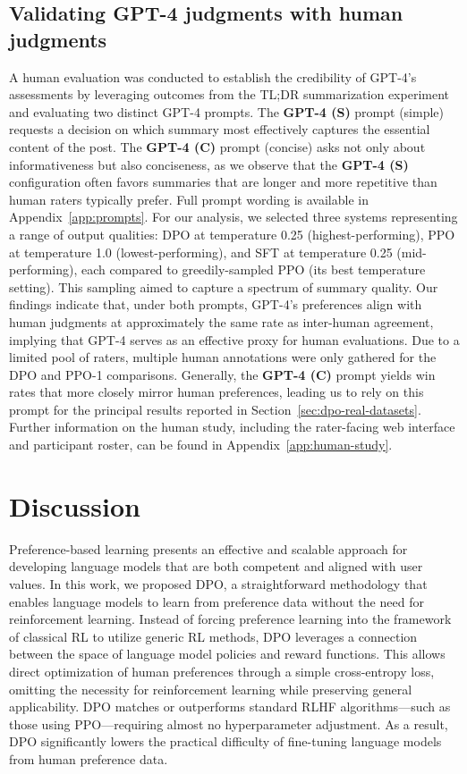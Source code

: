 \subsection{Validating GPT-4 judgments with human judgments}
\label{sec:human-judgments}
A human evaluation was conducted to establish the credibility of GPT-4's assessments by leveraging outcomes from the TL;DR summarization experiment and evaluating two distinct GPT-4 prompts. The \textbf{GPT-4 (S)} prompt (simple) requests a decision on which summary most effectively captures the essential content of the post. The \textbf{GPT-4 (C)} prompt (concise) asks not only about informativeness but also conciseness, as we observe that the \textbf{GPT-4 (S)} configuration often favors summaries that are longer and more repetitive than human raters typically prefer. Full prompt wording is available in Appendix~\ref{app:prompts}. For our analysis, we selected three systems representing a range of output qualities: DPO at temperature 0.25 (highest-performing), PPO at temperature 1.0 (lowest-performing), and SFT at temperature 0.25 (mid-performing), each compared to greedily-sampled PPO (its best temperature setting). This sampling aimed to capture a spectrum of summary quality. Our findings indicate that, under both prompts, GPT-4’s preferences align with human judgments at approximately the same rate as inter-human agreement, implying that GPT-4 serves as an effective proxy for human evaluations. Due to a limited pool of raters, multiple human annotations were only gathered for the DPO and PPO-1 comparisons. Generally, the \textbf{GPT-4 (C)} prompt yields win rates that more closely mirror human preferences, leading us to rely on this prompt for the principal results reported in Section~\ref{sec:dpo-real-datasets}. Further information on the human study, including the rater-facing web interface and participant roster, can be found in Appendix~\ref{app:human-study}.

\section{Discussion}
Preference-based learning presents an effective and scalable approach for developing language models that are both competent and aligned with user values. In this work, we proposed DPO, a straightforward methodology that enables language models to learn from preference data without the need for reinforcement learning. Instead of forcing preference learning into the framework of classical RL to utilize generic RL methods, DPO leverages a connection between the space of language model policies and reward functions. This allows direct optimization of human preferences through a simple cross-entropy loss, omitting the necessity for reinforcement learning while preserving general applicability. DPO matches or outperforms standard RLHF algorithms—such as those using PPO—requiring almost no hyperparameter adjustment. As a result, DPO significantly lowers the practical difficulty of fine-tuning language models from human preference data.

